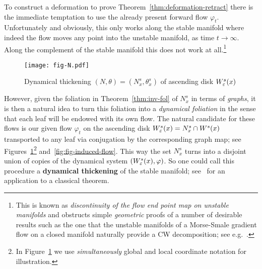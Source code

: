 \documentclass{article}
\begin{document}
To construct a deformation to prove Theorem~\ref{thm:deformation-retract}
there is the immediate temptation to use the already present forward
flow $\varphi_t$. Unfortunately and obviously, this only works along the stable manifold
where indeed the flow moves any point into the unstable manifold, as time $t\to\infty$.
Along the complement of the stable manifold this does not work at all.\footnote{
  This is known as \emph{discontinuity of the flow end point map on
  unstable manifolds} and obstructs simple \emph{geometric} proofs of a
  number of desirable results such as the one that the unstable
  manifolds of a Morse-Smale gradient flow on a closed manifold
  naturally provide a CW decomposition; see e.g.~{\cite{bott:1988a,banyaga:2004a,nicolaescu:2011a,burghelea:2011a-arXiv,2011arXiv1102.2838Q}}.
  }
%
\begin{figure}%
  \centering
  \texttt{[image: fig-N.pdf]}
  \caption{Dynamical thickening $(N,\theta)=(N^s_x,\theta^s_x)$
                 of ascending disk $W^s_{\varepsilon}(x)$
                }
  \label{fig:fig-N}
\end{figure}
%
However, given the foliation in Theorem~\ref{thm:inv-fol} of $N_x^s$ in terms of \emph{graphs},
it is then a natural idea to turn this foliation into a \emph{dynamical foliation}
in the sense that each leaf will be endowed with its own flow. The natural candidate
for these flows is our given flow $\varphi_t$ on the ascending disk
$W^s_{\varepsilon}(x)=N^s_x\cap W^s(x)$ transported to any leaf via conjugation by the corresponding
graph map; see Figures~\ref{fig:fig-N}\footnote{
  In Figure~\ref{fig:fig-N} we use \emph{simultaneously} global and
  local coordinate notation for illustration.
  } and~\ref{fig:fig-induced-flow}.
This way the set $N_x^s$ turns into a disjoint union of copies of the dynamical
system $(W^s_{\varepsilon}(x),\varphi)$. So one could call this procedure a {\bf dynamical thickening} of
the stable manifold; see~\cite{weber:2014e} for an application to a classical theorem.
\end{document}
